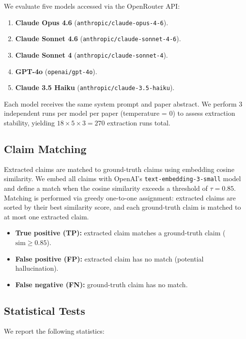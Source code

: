 \documentclass[11pt,a4paper]{article}
\begin{document}
We evaluate five models accessed via the OpenRouter API:

\begin{enumerate}
  \item \textbf{Claude Opus 4.6} (\texttt{anthropic/claude-opus-4-6}).
  \item \textbf{Claude Sonnet 4.6} (\texttt{anthropic/claude-sonnet-4-6}).
  \item \textbf{Claude Sonnet 4} (\texttt{anthropic/claude-sonnet-4}).
  \item \textbf{GPT-4o} (\texttt{openai/gpt-4o}).
  \item \textbf{Claude 3.5 Haiku} (\texttt{anthropic/claude-3.5-haiku}).
\end{enumerate}

Each model receives the same system prompt and paper abstract.  We perform
3 independent runs per model per paper (temperature = 0) to assess
extraction stability, yielding $18 \times 5 \times 3 = 270$ extraction
runs total.

\subsection{Claim Matching}
\label{sec:matching}

Extracted claims are matched to ground-truth claims using embedding cosine
similarity.  We embed all claims with OpenAI's
\texttt{text-embedding-3-small} model and define a match when the cosine
similarity exceeds a threshold of $\tau = 0.85$.  Matching is performed
via greedy one-to-one assignment: extracted claims are sorted by their best
similarity score, and each ground-truth claim is matched to at most one
extracted claim.

\begin{itemize}
  \item \textbf{True positive (TP):} extracted claim matches a
        ground-truth claim ($\mathrm{sim} \geq 0.85$).
  \item \textbf{False positive (FP):} extracted claim has no match
        (potential hallucination).
  \item \textbf{False negative (FN):} ground-truth claim has no match.
\end{itemize}

\subsection{Statistical Tests}
\label{sec:statistics}

We report the following statistics:
\end{document}

